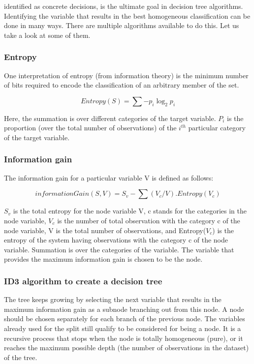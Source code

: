 \documentclass{article}
\numberwithin{equation}{section} %
\begin{document}
identified as concrete decisions, is the ultimate goal in decision tree algorithms.
Identifying the variable that results in the best homogeneous classification can be
done in many ways. There are multiple algorithms available to do this. Let us take a
look at some of them.

\subsubsection*{Entropy}

One interpretation of entropy (from information theory) is the minimum number of bits required to encode the classification of an arbitrary member of the set. 

\begin{equation*}
Entropy(S) = \sum-p_i\log_2p_i
\end{equation*}

Here, the summation is over different categories of the target variable. $P_i$ is the proportion (over the total number of observations) of the $i^{th}$ particular category of the target variable.


\subsubsection*{Information gain}

The information gain for a particular variable V is defined as follows:

\begin{equation*}
information Gain ( S , V ) = S_v - \sum(V_c	/V). Entropy(V_c)
\end{equation*}

$S_v$ is the total entropy for the node variable V, c stands for the categories in the node variable, $V_c$ is the number of total observation with the category c of the node variable, V is the total number of observations, and Entropy($V_c$) is the entropy of the system having observations with the category c of the node variable. Summation is over the categories of the variable. The variable that provides the maximum information gain is chosen to be the node. \\

\subsubsection*{ID3 algorithm to create a decision tree}

The tree keeps growing by selecting the next variable that results in the maximum
information gain as a subnode branching out from this node. A node should be chosen separately for each branch of the previous node. The variables already used for the split still qualify to be considered for being a node. It is a recursive process that stops when the node is totally homogeneous (pure), or it reaches the maximum possible depth (the number of observations in the dataset) of the tree. \\
\end{document}
